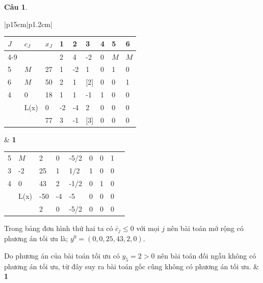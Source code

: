 \documentclass[12pt,a4letter]{article}
\theoremstyle{definition}
\newtheorem{cauhoi}{Câu}
\newenvironment{phandiem}{%
\par\noindent
\begin{longtable}[t]{|p{15cm}|p{1.2cm}|}
\hline
}{%
\end{longtable}
}
\newcommand\diem[1]{ & \hfil \textbf{#1} \\ \hline}
\begin{document}
\begin{cauhoi}
\begin{traloi}
\begin{phandiem}
\begin{center}
\renewcommand{\arraystretch}{1.25}
\begin{tabular}{| l | l | l | l  l  l  l  l  l |}
\hline
$J$&$c_J$&$x_J$&1&2&3&4&5&6\\ 
\cline{4-9}
   &     &   &2&4 &-2 &0&$M$&$M$\\ 
\hline
5&$M$&27&1 &-2 & 1   &0& 1&0\\
6&$M$&50 &2& 1&[2]  & 0& 0&1\\
4&0     &18 &1& 1& -1   & 1& 0&0\\
\hline
&L(x) &0  &-2&-4&2& 0& 0&0\\
&       &77 & 3&-1&[3]&0& 0&0\\
\hline
\end{tabular}
\end{center}
\diem{1}

\begin{center}
\renewcommand{\arraystretch}{1.25}
\begin{tabular}{| l | l | l | l  l  l  l  l  l |}
\hline
5&$M$&2   &0&-5/2 &0   &0& 1&\\
3&-2    &25 &1& 1/2 &1  & 0& 0&\\
4&0     &43 &2 &-1/2& 0   & 1& 0&\\
\hline
&L(x) &-50  &-4&-5&0& 0& 0&\\
&        &2    & 0&-5/2&0&0& 0&\\
\hline
\end{tabular}
\end{center}

Trong bảng đơn hình thứ hai ta có $\bar c_j\le 0$ với mọi $j$ nên bài toán mở rộng có phương án tối ưu là; $y^0=(0,0,25,43,2,0)$.

Do phương án của bài toán tối ưu có $y_5=2>0$ nên bài toán đối ngẫu không có phương án tối ưu, từ đây suy ra bài toán gốc cũng không có phương án tối ưu. 
\diem{1}

\end{phandiem}
 \end{traloi}
\end{cauhoi}

\end{document}
